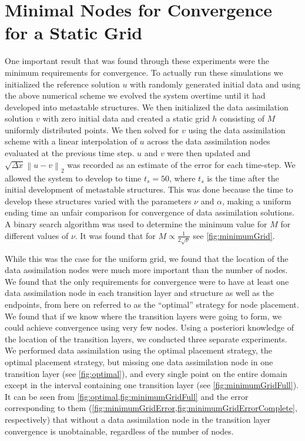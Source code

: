 \documentclass[12pt]{amsart}
\theoremstyle{plain}
\theoremstyle{definition}
\theoremstyle{remark}
\numberwithin{equation}{section} %
\numberwithin{figure}{section}   %
\newcommand{\norm}[1]{\left\|#1\right\|}
\begin{document}
\section{Minimal Nodes for Convergence for a Static Grid}
One important result that was found through these experiments were the minimum requirements for convergence. To actually run these simulations we initialized the reference solution $u$ with randomly generated initial data and using the above numerical scheme we evolved the system overtime until it had developed into metastable structures. We then initialized the data assimilation solution $v$ with zero initial data and created a static grid $h$ consisting of $M$ uniformly distributed points. We then solved for $v$ using the data assimilation scheme with a linear interpolation of $u$ across the data assimilation nodes evaluated at the previous time step. $u$ and $v$ were then updated and $\sqrt{\Delta x}\norm{u-v}_2$ was recorded as an estimate of the error for each time-step. We allowed the system to develop to time $t_s = 50$, where $t_s$ is the time after the initial development of metastable structures. This was done because the time to develop these structures varied with the parameters $\nu$ and $\alpha$, making a uniform ending time an unfair comparison for convergence of data assimilation solutions. A binary search algorithm was used to determine the minimum value for $M$ for different values of $\nu$. It was found that for $M\propto \frac{1}{2\sqrt{\nu}}$ see \ref{fig:minimumGrid}.

While this was the case for the uniform grid, we found that the location of the data assimilation nodes were much more important than the number of nodes. We found that the only requirements for convergence were to have at least one data assimilation node in each transition layer and structure as well as the endpoints, from here on referred to as the ``optimal'' strategy for node placement. We found that if we know where the transition layers were going to form, we could achieve convergence using very few nodes. Using a posteriori knowledge of the location of the transition layers, we conducted three separate experiments. We performed data assimilation using the optimal placement strategy, the optimal placement strategy, but missing one data assimilation node in one transition layer (see \cref{fig:optimal}), and every single point on the entire domain except in the interval containing one transition layer (see \cref{fig:minimumGridFull}). It can be seen from \cref{fig:optimal,fig:minimumGridFull} and the error corresponding to them (\cref{fig:minimumGridError,fig:minimumGridErrorComplete}, respectively) that without a data assimilation node in the transition layer convergence is unobtainable, regardless of the number of nodes. 
\end{document}
